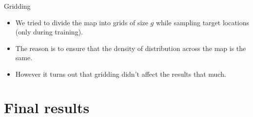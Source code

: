 \documentclass{beamer}
\begin{document}
\begin{frame}{Gridding}
\begin{itemize}
    \item We tried to divide the map into grids of size $g$ while sampling target locations (only during training).
    \item The reason is to ensure that the density of distribution across the map is the same.
    \item However it turns out that gridding didn't affect the results that much.
\end{itemize}
\end{frame}

\section{Final results}
\begin{frame}
\end{frame}

\end{document}
